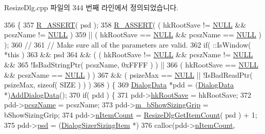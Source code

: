 Resize\+Dlg.\+cpp 파일의 344 번째 라인에서 정의되었습니다.


\begin{DoxyCode}
356 \{
357   \mbox{\hyperlink{_win_helper_8h_aeb6b3a05243ebc8646e694a65d4b21a3}{R\_ASSERT}}( psd );
358   \mbox{\hyperlink{_win_helper_8h_aeb6b3a05243ebc8646e694a65d4b21a3}{R\_ASSERT}}( ( hkRootSave != \mbox{\hyperlink{getopt1_8c_a070d2ce7b6bb7e5c05602aa8c308d0c4}{NULL}} && pcszName != \mbox{\hyperlink{getopt1_8c_a070d2ce7b6bb7e5c05602aa8c308d0c4}{NULL}} )
359             || ( hkRootSave == \mbox{\hyperlink{getopt1_8c_a070d2ce7b6bb7e5c05602aa8c308d0c4}{NULL}} && pcszName == \mbox{\hyperlink{getopt1_8c_a070d2ce7b6bb7e5c05602aa8c308d0c4}{NULL}} ) );
360   \textcolor{comment}{//}
361   \textcolor{comment}{//    Make sure all of the parameters are valid.}
362   \textcolor{keywordflow}{if}( ::IsWindow( *\textcolor{keyword}{this} )
363       && psd
364       && ( ( hkRootSave != \mbox{\hyperlink{getopt1_8c_a070d2ce7b6bb7e5c05602aa8c308d0c4}{NULL}} && pcszName != \mbox{\hyperlink{getopt1_8c_a070d2ce7b6bb7e5c05602aa8c308d0c4}{NULL}} &&
365              !IsBadStringPtr( pcszName, 0xFFFF ) ) ||
366            ( hkRootSave == \mbox{\hyperlink{getopt1_8c_a070d2ce7b6bb7e5c05602aa8c308d0c4}{NULL}} && pcszName == \mbox{\hyperlink{getopt1_8c_a070d2ce7b6bb7e5c05602aa8c308d0c4}{NULL}} ) )
367       && ( psizeMax == \mbox{\hyperlink{getopt1_8c_a070d2ce7b6bb7e5c05602aa8c308d0c4}{NULL}} || !IsBadReadPtr( psizeMax, \textcolor{keyword}{sizeof}( SIZE ) ) )
368       ) \{
369     \mbox{\hyperlink{struct_dialog_data}{DialogData}} *pdd = (\mbox{\hyperlink{struct_dialog_data}{DialogData}} *)\mbox{\hyperlink{class_resize_dlg_a5657ce3f83f261aceaf138cd1c69f0fc}{AddDialogData}}();
370     \textcolor{keywordflow}{if}( pdd ) \{
371       pdd->\mbox{\hyperlink{struct_dialog_data_a25f688fc8282ac98c0d49658310425ce}{hkRootSave}} = hkRootSave;
372       pdd->\mbox{\hyperlink{struct_dialog_data_a6ab5be3a7126b6f9b5fcb7131fcf2909}{pcszName}} = pcszName;
373       pdd->\mbox{\hyperlink{struct_dialog_data_aba0ab2f5717e72e528e95a8a1c6a651e}{m\_bShowSizingGrip}} = bShowSizingGrip;
374       pdd->\mbox{\hyperlink{struct_dialog_data_acd196414db13af6456bbb413f2d1fa7d}{nItemCount}} = \mbox{\hyperlink{_resize_dlg_8cpp_a42fd95f9181ab52619b7bd3e5d51475b}{ResizeDlgGetItemCount}}( psd ) + 1;
375       pdd->\mbox{\hyperlink{struct_dialog_data_aefb399f16dab34e6a2da67716d6147fc}{psd}} = (\mbox{\hyperlink{struct_dialog_sizer_sizing_item}{DialogSizerSizingItem}} *)
376         calloc(pdd->\mbox{\hyperlink{struct_dialog_data_acd196414db13af6456bbb413f2d1fa7d}{nItemCount}},

\end{DoxyCode}
